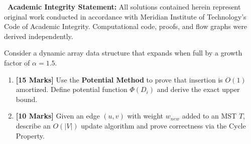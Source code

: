 \documentclass[11pt,a4paper]{article}
\begin{document}
\vspace{-4pt}

\begin{tcolorbox}[infobox]
\sffamily\small\color{navyprimary}
\faClipboardList~\textbf{Academic Integrity Statement:} 
All solutions contained herein represent original work conducted in accordance with Meridian Institute of Technology's Code of Academic Integrity. Computational code, proofs, and flow graphs were derived independently.
\end{tcolorbox}

\vspace{2pt}


\begin{tcolorbox}[problembox, title={\faLayerGroup~~Problem 1: Amortized Complexity \& Dynamic Arrays \hfill \normalfont\sffamily\small\textbf{[25 Marks]}}]
Consider a dynamic array data structure that expands when full by a growth factor of $\alpha = 1.5$. 
\begin{enumerate}[label=\alph*\lbrack\rbrack, leftmargin=1.8em, itemsep=1pt]
    \item \textbf{[15 Marks]} Use the \textbf{Potential Method} to prove that insertion is $O(1)$ amortized. Define potential function $\Phi(D_i)$ and derive the exact upper bound.
    \item \textbf{[10 Marks]} Given an edge $(u, v)$ with weight $w_{new}$ added to an MST $T$, describe an $O(|V|)$ update algorithm and prove correctness via the Cycle Property.
\end{enumerate}
\end{tcolorbox}

\vspace{2pt}
\end{document}

